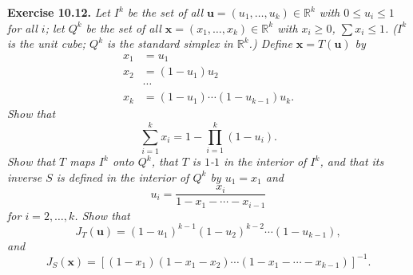 \documentclass{article}
\begin{document}
\textbf{Exercise 10.12.}
\emph{Let $I^k$ be the set of all $\mathbf{u} = (u_1,\ldots,u_k) \in \mathbb{R}^k$
with $0 \leq u_i \leq 1$ for all $i$;
let $Q^k$ be the set of all $\mathbf{x} = (x_1,\ldots,x_k) \in \mathbb{R}^k$
with $x_i \geq 0$, $\sum x_i \leq 1$.
($I^k$ is the unit cube; $Q^k$ is the standard simplex in $\mathbb{R}^k$.)
Define $\mathbf{x} = T(\mathbf{u})$ by
\begin{align*}
  x_1 &= u_1 \\
  x_2 &= (1-u_1)u_2 \\
  &\cdots \\
  x_k &= (1-u_1) \cdots (1-u_{k-1})u_k.
\end{align*}
Show that
\[
  \sum_{i=1}^{k} x_i = 1 - \prod_{i=1}^{k} (1-u_i).
\]
Show that $T$ maps $I^k$ onto $Q^k$, that $T$ is $1$-$1$ in the interior of $I^k$,
and that its inverse $S$ is defined in the interior of $Q^k$ by $u_1 = x_1$ and
\[
  u_i = \frac{x_i}{1-x_1-\cdots-x_{i-1}}
\]
for $i = 2, \ldots, k$.
Show that
\[
  J_T(\mathbf{u}) = (1-u_1)^{k-1}(1-u_2)^{k-2} \cdots (1-u_{k-1}),
\]
and}
\[
  J_S(\mathbf{x}) = [(1-x_1)(1-x_1-x_2) \cdots (1-x_1-\cdots-x_{k-1})]^{-1}.
\] \\
\end{document}
